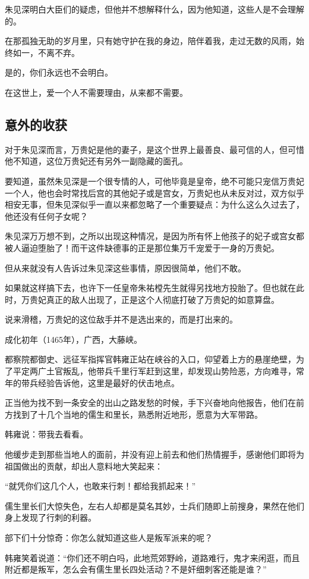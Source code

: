 \begin{multicols}{\theparacolNo}
朱见深明白大臣们的疑虑，但他并不想解释什么，因为他知道，这些人是不会理解的。

在那孤独无助的岁月里，只有她守护在我的身边，陪伴着我，走过无数的风雨，始终如一，不离不弃。

是的，你们永远也不会明白。

在这世上，爱一个人不需要理由，从来都不需要。

\subsection{意外的收获}
对于朱见深而言，万贵妃是他的妻子，是这个世界上最善良、最可信的人，但可惜他不知道，这位万贵妃还有另外一副隐藏的面孔。

要知道，虽然朱见深是一个很专情的人，可他毕竟是皇帝，绝不可能只宠信万贵妃一个人，他也会时常找后宫的其他妃子或是宫女，万贵妃也从未反对过，双方似乎相安无事，但朱见深似乎一直以来都忽略了一个重要疑点：为什么这么久过去了，他还没有任何子女呢？

朱见深万万想不到，之所以出现这种情况，是因为所有怀上他孩子的妃子或宫女都被人逼迫堕胎了！而干这件缺德事的正是那位集万千宠爱于一身的万贵妃。

但从来就没有人告诉过朱见深这些事情，原因很简单，他们不敢。

如果就这样搞下去，也许下一任皇帝朱祐樘先生就得另找地方投胎了。但也就在此时，万贵妃真正的敌人出现了，正是这个人彻底打破了万贵妃的如意算盘。

说来滑稽，万贵妃的这位敌手并不是选出来的，而是打出来的。

成化初年（1465年），广西，大藤峡。

都察院都御史、远征军指挥官韩雍正站在峡谷的入口，仰望着上方的悬崖绝壁，为了平定两广土官叛乱，他带兵千里行军赶到这里，却发现山势险恶，方向难寻，常年的带兵经验告诉他，这里是最好的伏击地点。

正当他为找不到一条安全的出山之路发愁的时候，手下兴奋地向他报告，他们在前方找到了十几个当地的儒生和里长，熟悉附近地形，愿意为大军带路。

韩雍说：带我去看看。

他缓步走到那些当地人的面前，并没有迎上前去和他们热情握手，感谢他们即将为祖国做出的贡献，却出人意料地大笑起来：

“就凭你们这几个人，也敢来行刺！都给我抓起来！”

儒生里长们大惊失色，左右人却都是莫名其妙，士兵们随即上前搜身，果然在他们身上发现了行刺的利器。

部下们十分惊奇：你怎么就知道这些人是叛军派来的呢？

韩雍笑着说道：“你们还不明白吗，此地荒郊野岭，道路难行，鬼才来闲逛，而且附近都是叛军，怎么会有儒生里长四处活动？不是奸细刺客还能是谁？”


\end{multicols}

